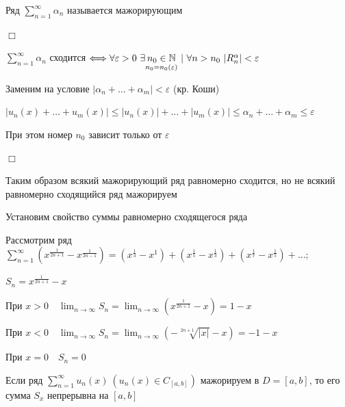 \documentclass[12pt]{article}
\begin{document}
    \Nota Ряд $\sum_{n = 1}^\infty \alpha_n$ называется мажорирующим

    \begin{MyProof}
        $\Box$

        $\sum_{n = 1}^\infty \alpha_n$ сходится $\Longleftrightarrow \forall \varepsilon > 0 \ \exists \underset{n_0 = n_0(\varepsilon)}{n_0 \in \mathbb{N}} \ | \
        \forall n > n_0 \ |R_n^\alpha| < \varepsilon$

        Заменим на условие $|\alpha_n + \dots + \alpha_m| < \varepsilon$ (кр. Коши)

        $|u_n(x) + \dots + u_m(x)| \leq |u_n(x)| + \dots + |u_m(x)| \leq \alpha_n + \dots + \alpha_m \leq \varepsilon$

        При этом номер $n_0$ зависит только от $\varepsilon$

        $\Box$
    \end{MyProof}

    \Nota Таким образом всякий мажорирующий ряд равномерно сходится, но не всякий равномерно сходящийся ряд мажорируем

    \Nota Установим свойство суммы равномерно сходящегося ряда

    \Exs Рассмотрим ряд $\sum_{n = 1}^\infty (x^{\frac{1}{2n + 1}} - x^{\frac{1}{2n - 1}}) = (x^\frac{1}{3} - x^1) + (x^\frac{1}{5} - x^\frac{1}{3}) + (x^\frac{1}{7} - x^\frac{1}{5}) + \dots;$

    $S_n = x^\frac{1}{2n + 1} - x$

    При $x > 0 \quad \lim_{n \to \infty} S_n = \lim_{n \to \infty} (x^\frac{1}{2n + 1} - x) = 1 - x$

    При $x < 0 \quad \lim_{n \to \infty} S_n = \lim_{n \to \infty} (-\sqrt[2n + 1]{|x|} - x) = -1 - x$

    При $x = 0 \quad S_n = 0$


    \begin{MyTheorem}
        \Ths Если ряд $\sum_{n = 1}^\infty u_n(x) \ (u_n(x) \in C_{[a, b]})$ мажорируем в $D = [a, b]$, то 
        его сумма $S_x$ непрерывна на $[a, b]$
    \end{MyTheorem}
\end{document}
